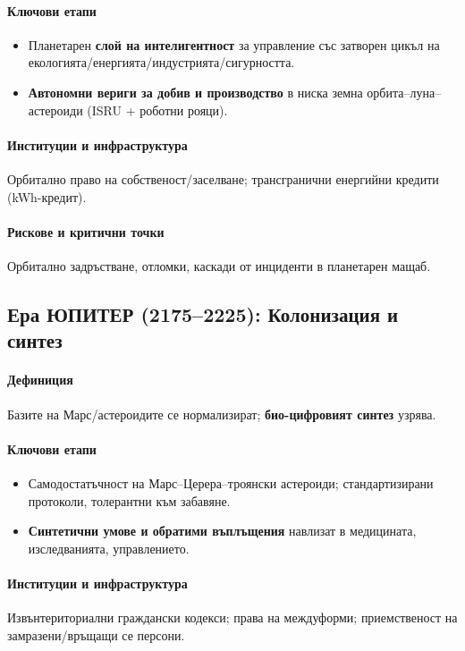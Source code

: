 \documentclass[11pt]{article}
\begin{document}
\paragraph{Ключови етапи}
\begin{itemize}[noitemsep]
  \item Планетарен \textbf{слой на интелигентност} за управление със затворен цикъл на екологията/енергията/индустрията/сигурността.
  \item \textbf{Автономни вериги за добив и производство} в ниска земна орбита–луна–астероиди (ISRU + роботни рояци).
\end{itemize}

\paragraph{Институции и инфраструктура} Орбитално право на собственост/заселване; трансгранични енергийни кредити (kWh-кредит).

\paragraph{Рискове и критични точки} Орбитално задръстване, отломки, каскади от инциденти в планетарен мащаб.

\subsection{Ера ЮПИТЕР (2175–2225): Колонизация и синтез}
\paragraph{Дефиниция} Базите на Марс/астероидите се нормализират; \textbf{био-цифровият синтез} узрява.

\paragraph{Ключови етапи}
\begin{itemize}[noitemsep]
  \item Самодостатъчност на Марс–Церера–троянски астероиди; стандартизирани протоколи, толерантни към забавяне.
  \item \textbf{Синтетични умове и обратими въплъщения} навлизат в медицината, изследванията, управлението.
\end{itemize}

\paragraph{Институции и инфраструктура} Извънтериториални граждански кодекси; права на междуформи; приемственост на замразени/връщащи се персони.
\end{document}

